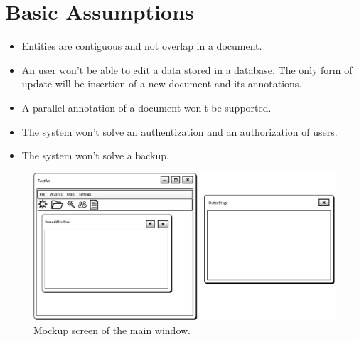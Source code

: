\section{Basic Assumptions}
\begin{itemize}
	\item Entities are contiguous and not overlap in a document.
	\item An user won't be able to edit a data stored in a database. The only form
	of update will be insertion of a new document and its annotations.
	\item A parallel annotation of a document won't be supported.
	\item The system won't solve an authentization and  an authorization of users.
	\item The system won't solve a backup.
\end{itemize}


\begin{figure}[!htb]
        \centering
        \includegraphics[width=\textwidth]{Images/MockupMainWindow}
        \caption{Mockup screen of the main window.}
        \label{fig:MockupMainWindow}
\end{figure}
